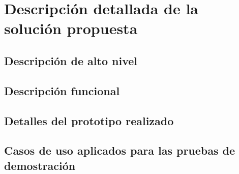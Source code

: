\chapter{Descripción detallada de la solución propuesta}
\section{Descripción de alto nivel}
\section{Descripción funcional}
\section{Detalles del prototipo realizado}
\section{Casos de uso aplicados para las pruebas de demostración}

